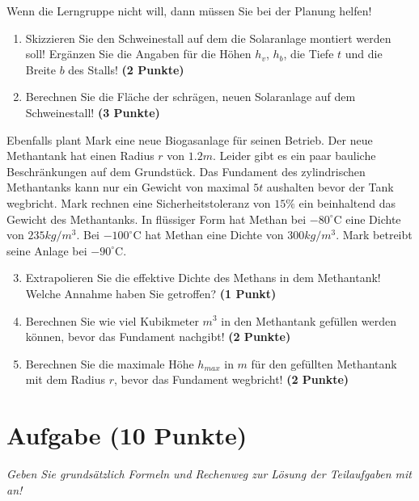 \documentclass[a4paper, 9pt]{scrartcl}\usepackage[]{graphicx}\usepackage[]{xcolor}
\begin{document}
Wenn die Lerngruppe nicht will, dann müssen Sie bei der Planung helfen!

\begin{enumerate}
\item Skizzieren Sie den Schweinestall auf dem die Solaranlage montiert werden soll! Ergänzen Sie die Angaben für die Höhen $h_v$, $h_b$, die Tiefe $t$ und die Breite $b$ des Stalls!  \textbf{(2 Punkte)}
\item Berechnen Sie die Fläche der schrägen, neuen Solaranlage auf dem Schweinestall! \textbf{(3 Punkte)}
\end{enumerate}

Ebenfalls plant Mark eine neue Biogasanlage für seinen Betrieb. Der neue Methantank hat einen Radius $r$ von $1.2m$. Leider gibt es ein paar bauliche Beschränkungen auf dem Grundstück. Das Fundament des zylindrischen Methantanks kann nur ein Gewicht von maximal $5t$ aushalten bevor der Tank wegbricht. Mark rechnen eine Sicherheitstoleranz von $15\%$ ein beinhaltend das Gewicht des Methantanks. In flüssiger Form hat Methan bei $-80^\circ\text{C}$ eine Dichte von $235kg/m^3$. Bei $-100^\circ\text{C}$ hat Methan eine Dichte von $300kg/m^3$. Mark betreibt seine Anlage bei $-90^\circ\text{C}$.

\begin{enumerate}
  \setcounter{enumi}{2}
\item Extrapolieren Sie die effektive Dichte des Methans in dem Methantank! Welche Annahme haben Sie getroffen? \textbf{(1 Punkt)}
\item Berechnen Sie wie viel Kubikmeter $m^3$ in den Methantank gefüllen werden können, bevor das Fundament nachgibt! \textbf{(2 Punkte)}
\item Berechnen Sie die maximale Höhe $h_{max}$ in $m$ für den gefüllten Methantank mit dem Radius $r$, bevor das Fundament wegbricht! \textbf{(2 Punkte)}
\end{enumerate}

 
\clearpage

\section{Aufgabe \hfill (10 Punkte)}

\textit{Geben Sie grundsätzlich Formeln und Rechenweg zur Lösung der Teilaufgaben mit an!} \\[1Ex]
 
\end{document}

